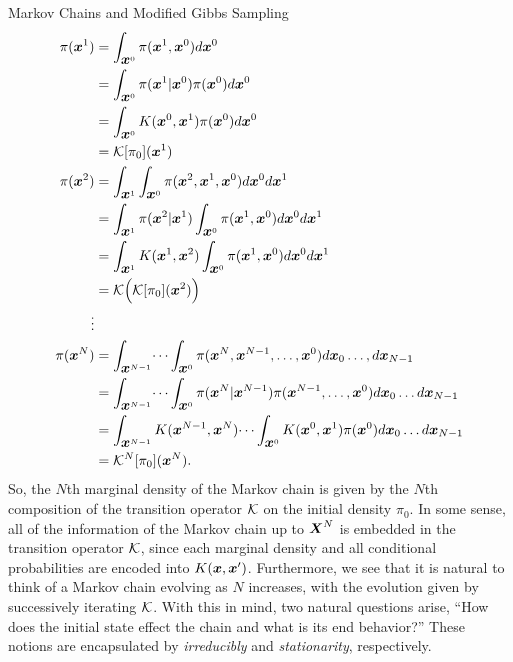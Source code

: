 \begin{chapter}{Markov Chains and Modified Gibbs Sampling}
\begin{align} 
  \pi(\mbox{\boldmath$x$}^1) 
    &= \int_{\mbox{\boldmath$x$}^0} \pi(\mbox{\boldmath$x$}^1,\mbox{\boldmath$x$}^0) d\mbox{\boldmath$x$}^0 \nonumber\\
    &= \int_{\mbox{\boldmath$x$}^0} \pi(\mbox{\boldmath$x$}^1|\mbox{\boldmath$x$}^0)\pi( \mbox{\boldmath$x$}^0) d\mbox{\boldmath$x$}^0 \nonumber\\
    &= \int_{\mbox{\boldmath$x$}^0} K(\mbox{\boldmath$x$}^0,\mbox{\boldmath$x$}^1)\pi( \mbox{\boldmath$x$}^0) d\mbox{\boldmath$x$}^0\nonumber\\
    &= \mathcal K [\pi_0](\mbox{\boldmath$x$}^1) \\
  \pi(\mbox{\boldmath$x$}^2) 
    &= \int_{\mbox{\boldmath$x$}^1}\int_{\mbox{\boldmath$x$}^0} \pi(\mbox{\boldmath$x$}^2,\mbox{\boldmath$x$}^1,\mbox{\boldmath$x$}^0) d\mbox{\boldmath$x$}^0 d\mbox{\boldmath$x$}^1\nonumber\\
    &= \int_{\mbox{\boldmath$x$}^1}\pi(\mbox{\boldmath$x$}^2|\mbox{\boldmath$x$}^1)\int_{\mbox{\boldmath$x$}^0} \pi(\mbox{\boldmath$x$}^1,\mbox{\boldmath$x$}^0) d\mbox{\boldmath$x$}^0 d\mbox{\boldmath$x$}^1\nonumber\\
    &= \int_{\mbox{\boldmath$x$}^1}K(\mbox{\boldmath$x$}^1,\mbox{\boldmath$x$}^2)\int_{\mbox{\boldmath$x$}^0} \pi(\mbox{\boldmath$x$}^1,\mbox{\boldmath$x$}^0) d\mbox{\boldmath$x$}^0 d\mbox{\boldmath$x$}^1\nonumber\\
    &= \mathcal K \Big( \mathcal K [\pi_0](\mbox{\boldmath$x$}^2)\Big)\\
    \vdots\nonumber\\
  \pi(\mbox{\boldmath$x$}^N)  
    &= \int_{\mbox{\boldmath$x$}^{N-1}}\dots\int_{\mbox{\boldmath$x$}^0} \pi(\mbox{\boldmath$x$}^N, \mbox{\boldmath$x$}^{N-1},\dots,\mbox{\boldmath$x$}^0)d\mbox{\boldmath$x$}_0\dots,d\mbox{\boldmath$x$}_{N-1}\nonumber\\
    &= \int_{\mbox{\boldmath$x$}^{N-1}}\dots\int_{\mbox{\boldmath$x$}^0} \pi(\mbox{\boldmath$x$}^N| \mbox{\boldmath$x$}^{N-1})\pi(\mbox{\boldmath$x$}^{N-1},\dots,\mbox{\boldmath$x$}^0)d\mbox{\boldmath$x$}_0\dots d\mbox{\boldmath$x$}_{N-1} \nonumber\\
    &= \int_{\mbox{\boldmath$x$}^{N-1}}K( \mbox{\boldmath$x$}^{N-1},\mbox{\boldmath$x$}^N)\dots\int_{\mbox{\boldmath$x$}^0} K(\mbox{\boldmath$x$}^0,\mbox{\boldmath$x$}^1)\pi(\mbox{\boldmath$x$}^0)d\mbox{\boldmath$x$}_0\dots d\mbox{\boldmath$x$}_{N-1} \nonumber\\
    &= \mathcal K^N [\pi_0](\mbox{\boldmath$x$}^N).
\end{align}
So, the $N$th marginal density of the Markov chain is given by the $N$th composition of the transition operator $\mathcal K$ on the initial density $\pi_0$.
In some sense, all of the information of the Markov chain up to $\mbox{\boldmath$X$}^N$ is embedded in the transition operator $\mathcal K$, since each marginal density and all conditional probabilities are encoded into $K(\mbox{\boldmath$x$}, \mbox{\boldmath$x$}')$.
Furthermore, we see that it is natural to think of a Markov chain evolving as $N$ increases, with the evolution given by successively iterating $\mathcal K$.
With this in mind, two natural questions arise, ``How does the initial state effect the chain and what is its end behavior?'' 
These notions are encapsulated by \emph{irreducibly} and \emph{stationarity}, respectively.



\end{chapter}
